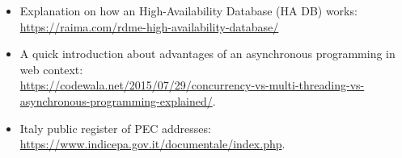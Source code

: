 \begin{itemize}
	\item Explanation on how an High-Availability Database (HA DB) works:\\
	\url{https://raima.com/rdme-high-availability-database/}
	\item A quick introduction about advantages of an asynchronous programming in web context:\\ \url{https://codewala.net/2015/07/29/concurrency-vs-multi-threading-vs-asynchronous-programming-explained/}.
	\item Italy public register of PEC addresses:\\
	\url{https://www.indicepa.gov.it/documentale/index.php}.
\end{itemize}